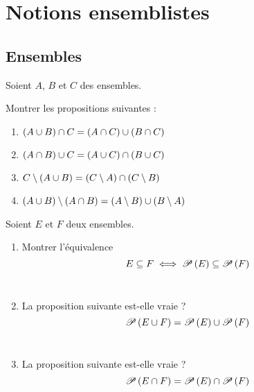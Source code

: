 \chapter{Notions ensemblistes}

\minitoc

\section{Ensembles}

\begin{exo}[Exercice 1]
Soient \(A\), \(B\) et \(C\) des ensembles.

Montrer les propositions suivantes :

\begin{enumerate}
\item \(\left(A\cup B\right)\cap C=\left(A\cap C\right)\cup\left(B\cap C\right)\) \\

\item \(\left(A\cap B\right)\cup C=\left(A\cup C\right)\cap\left(B\cup C\right)\) \\

\item \(C\setminus\left(A\cup B\right)=\left(C\setminus A\right)\cap\left(C\setminus B\right)\) \\

\item \(\left(A\cup B\right)\setminus\left(A\cap B\right)=\left(A\setminus B\right)\cup\left(B\setminus A\right)\)
\end{enumerate}
\end{exo}

\begin{corr}
\end{corr}

\begin{exo}[Exercice 2]
Soient \(E\) et \(F\) deux ensembles.

\begin{enumerate}
\item Montrer l'équivalence \[E\subseteq F\iff\mathscr{P}\left(E\right)\subseteq\mathscr{P}\left(F\right)\] \\

\item La proposition suivante est-elle vraie ? \[\mathscr{P}\left(E\cup F\right)=\mathscr{P}\left(E\right)\cup\mathscr{P}\left(F\right)\] \\

\item La proposition suivante est-elle vraie ? \[\mathscr{P}\left(E\cap F\right)=\mathscr{P}\left(E\right)\cap\mathscr{P}\left(F\right)\]
\end{enumerate}
\end{exo}

